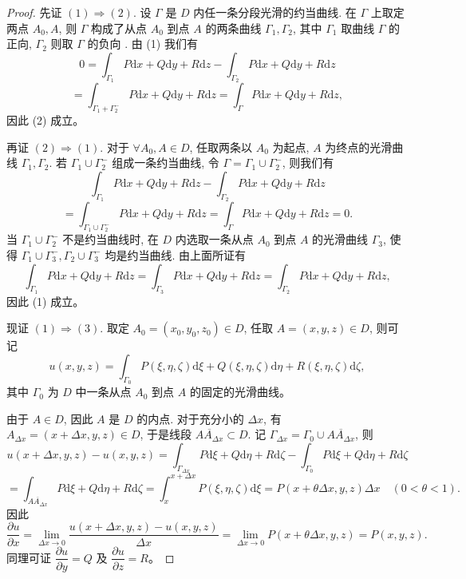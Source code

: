 \documentclass[UTF8,12pt,a4paper,fontset=fandol]{ctexart}
\begin{document}
\begin{proof}\quad 先证 $(1)\Rightarrow(2)$. 设 $\Gamma$ 是 $D$ 内任一条分段光滑的约当曲线. 在 $\Gamma$ 上取定两点 $A_0,A$, 则 $\Gamma$ 构成了从点 $A_0$ 到点 $A$ 的两条曲线 $\Gamma_1,\Gamma_2$, 其中 $\Gamma_1$ 取曲线 $\Gamma$ 的正向, $\Gamma_2$ 则取 $\Gamma$ 的负向 . 由 (1) 我们有
\[
  0=\int_{\Gamma_1}P\mathrm dx+Q\mathrm dy+R\mathrm dz
  -\int_{\Gamma_2}P\mathrm dx+Q\mathrm dy+R\mathrm dz
\]
\[
  =\int_{\Gamma_1+\Gamma_2^-}P\mathrm dx+Q\mathrm dy+R\mathrm dz
  =\int_\Gamma P\mathrm dx+Q\mathrm dy+R\mathrm dz,
\]
因此 (2) 成立。

再证 $(2)\Rightarrow(1)$. 对于 $\forall A_0,A\in D$, 任取两条以 $A_0$ 为起点, $A$ 为终点的光滑曲线 $\Gamma_1,\Gamma_2$. 若 $\Gamma_1\cup\Gamma_2^-$ 组成一条约当曲线, 令 $\Gamma=\Gamma_1\cup\Gamma_2^-$, 则我们有
\[
  \int_{\Gamma_1}P\mathrm dx+Q\mathrm dy+R\mathrm dz
  -\int_{\Gamma_2}P\mathrm dx+Q\mathrm dy+R\mathrm dz
\]
\[
  =\int_{\Gamma_1\cup\Gamma_2^-}P\mathrm dx+Q\mathrm dy+R\mathrm dz
  =\int_\Gamma P\mathrm dx+Q\mathrm dy+R\mathrm dz=0.
\]
当 $\Gamma_1\cup\Gamma_2^-$ 不是约当曲线时, 在 $D$ 内选取一条从点 $A_0$ 到点 $A$ 的光滑曲线 $\Gamma_3$, 使得 $\Gamma_1\cup\Gamma_3^-,\Gamma_2\cup\Gamma_3^-$ 均是约当曲线. 由上面所证有
\[
  \int_{\Gamma_1}P\mathrm dx+Q\mathrm dy+R\mathrm dz
  =\int_{\Gamma_3}P\mathrm dx+Q\mathrm dy+R\mathrm dz
  =\int_{\Gamma_2}P\mathrm dx+Q\mathrm dy+R\mathrm dz,
\]
因此 (1) 成立。

现证 $(1)\Rightarrow(3)$. 取定 $A_0=(x_0,y_0,z_0)\in D$, 任取 $A=(x,y,z)\in D$, 则可记
\[
  u(x,y,z)=\int_{\Gamma_0}P(\xi,\eta,\zeta)\mathrm d\xi
  +Q(\xi,\eta,\zeta)\mathrm d\eta
  +R(\xi,\eta,\zeta)\mathrm d\zeta,
\]
其中 $\Gamma_0$ 为 $D$ 中一条从点 $A_0$ 到点 $A$ 的固定的光滑曲线。

由于 $A\in D$, 因此 $A$ 是 $D$ 的内点. 对于充分小的 $\Delta x$, 有 $A_{\Delta x}=(x+\Delta x,y,z)\in D$, 于是线段 $\overline{AA_{\Delta x}}\subset D$. 记 $\Gamma_{\Delta x}=\Gamma_0\cup\overline{AA_{\Delta x}}$, 则
\[
  u(x+\Delta x,y,z)-u(x,y,z)
  =
  \int_{\Gamma_{\Delta x}}P\mathrm d\xi+Q\mathrm d\eta+R\mathrm d\zeta
  -\int_{\Gamma_0}P\mathrm d\xi+Q\mathrm d\eta+R\mathrm d\zeta
\]
\[
  =\int_{\overline{AA_{\Delta x}}}P\mathrm d\xi+Q\mathrm d\eta+R\mathrm d\zeta
  =\int_x^{x+\Delta x}P(\xi,\eta,\zeta)\mathrm d\xi
  =P(x+\theta\Delta x,y,z)\Delta x\quad(0<\theta<1).
\]
因此
\[
  \frac{\partial u}{\partial x}
  =\lim_{\Delta x\to0}\frac{u(x+\Delta x,y,z)-u(x,y,z)}{\Delta x}
  =\lim_{\Delta x\to0}P(x+\theta\Delta x,y,z)=P(x,y,z).
\]
同理可证 $\dfrac{\partial u}{\partial y}=Q$ 及 $\dfrac{\partial u}{\partial z}=R$。


\end{proof}
\end{document}
